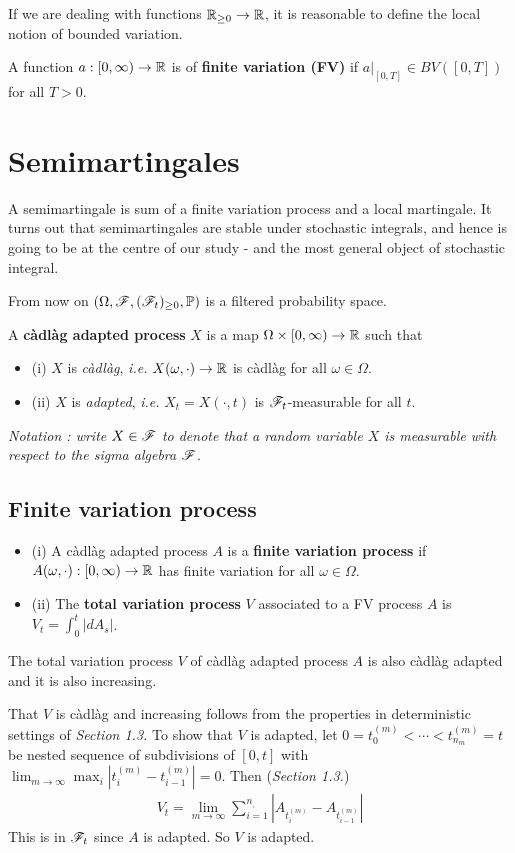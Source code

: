 \documentclass[12pt,a4paper]{article}
\newenvironment{proof}
{\begin{changemargin}{0.5cm}{0.5cm} 
	}%
	{\end{changemargin}
}
\renewenvironment{i}
{\begin{itemize} 
	}%
	{\end{itemize}
}
\begin{document}
If we are dealing with functions $\mathbb{R}_{\geq 0} \rightarrow \mathbb{R}$, it is reasonable to define the local notion of bounded variation.
\s

 A function $a:[0,\infty)\rightarrow \mathbb{R}$ is of \textbf{finite variation (FV)} if $a|_{[0,T]} \in BV([0,T])$ for all $T>0$.

\section{Semimartingales}

A semimartingale is sum of a finite variation process and a local martingale. It turns out that semimartingales are stable under stochastic integrals, and hence is going to be at the centre of our study - and the most general object of stochastic integral.
\s

From now on $(\Omega, \mathscr{F}, (\mathscr{F}_t)_{\geq 0}, \mathbb{P})$ is a filtered probability space.
\s

 A \textbf{c\`adl\`ag adapted process} $X$ is a map $\Omega \times[0,\infty) \rightarrow \mathbb{R}$ such that
\begin{i}
\item[(i)] $X$ is \emph{c\`adl\`ag}, \textit{i.e.} $X(\omega, \cdot)\rightarrow \mathbb{R}$ is c\`adl\`ag for all $\omega \in \Omega$.
\item[(ii)] $X$ is \emph{adapted}, \textit{i.e.} $X_t = X(\cdot,t)$ is $\mathscr{F}_t$-measurable for all $t$.
\end{i}
\textit{Notation : write $X\in \mathscr{F}$ to denote that a random variable $X$ is measurable with respect to the sigma algebra $\mathscr{F}$}.

\subsection{Finite variation process}

 \begin{i}
\item[(i)] A c\`adl\`ag adapted process $A$ is a \textbf{finite variation process} if $A(\omega, \cdot) : [0,\infty) \rightarrow \mathbb{R}$ has finite variation for all $\omega \in \Omega$.
\item[(ii)] The \textbf{total variation process} $V$ associated to a FV process $A$ is $V_t = \int_0^t |dA_s|$. 
\end{i}
\s

\fact The total variation process $V$ of c\`adl\`ag adapted process $A$ is also c\`adl\`ag adapted and it is also increasing.
\begin{proof}
\pf That $V$ is c\`adl\`ag and increasing follows from the properties in deterministic settings of \emph{Section 1.3.} To show that $V$ is adapted, let $0 = t_0^{(m)} < \cdots < t_{n_m}^{(m)} = t$ be nested sequence of subdivisions of $[0,t]$ with $\lim_{m\rightarrow \infty} \max_i |t_i^{(m)} - t_{i-1}^{(m)}| =0$. Then (\emph{Section 1.3.})
\begin{align*}
V_t = \lim_{m\rightarrow \infty} \sum_{i=1}^{n_,} |A_{t_i^{(m)}} - A_{t_{i-1}^{(m)}}|
\end{align*}
This is in $\mathscr{F}_t$ since $A$ is adapted. So $V$ is adapted.

\eop
\end{proof}
\s
\end{document}
